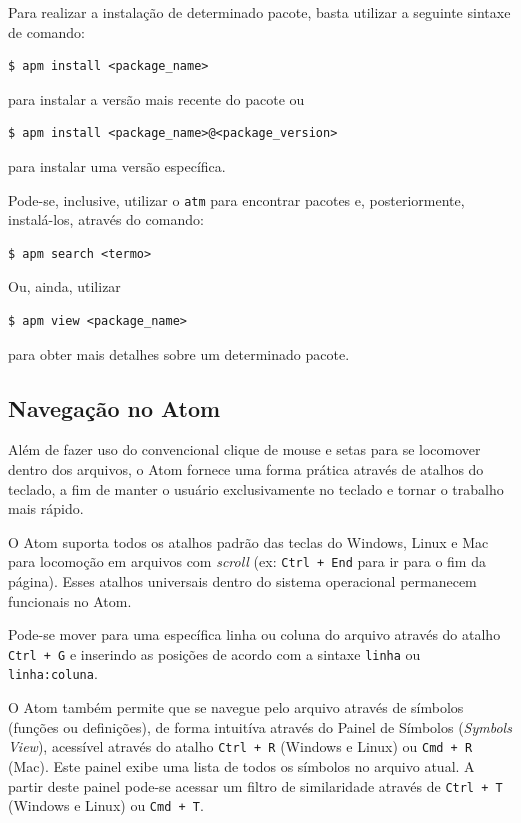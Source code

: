 	Para realizar a instalação de determinado pacote, basta utilizar a seguinte sintaxe de comando:
	\begin{Verbatim}[fontsize=\footnotesize]
$ apm install <package_name>
	\end{Verbatim}
	para instalar a versão mais recente do pacote ou
	\begin{Verbatim}[fontsize=\footnotesize]
$ apm install <package_name>@<package_version>
	\end{Verbatim}
	para instalar uma versão específica.

	Pode-se, inclusive, utilizar o \verb|atm| para encontrar pacotes e, posteriormente, instalá-los, através do comando:
	\begin{Verbatim}[fontsize=\footnotesize]
$ apm search <termo>
	\end{Verbatim}
	Ou, ainda, utilizar
	\begin{Verbatim}[fontsize=\footnotesize]
$ apm view <package_name>
	\end{Verbatim}
	para obter mais detalhes sobre um determinado pacote.

	\subsection{Navegação no Atom}
	Além de fazer uso do convencional clique de mouse e setas para se locomover dentro dos arquivos, o Atom fornece uma forma prática através de atalhos do teclado, a fim de manter o usuário exclusivamente no teclado e tornar o trabalho mais rápido.

	O Atom suporta todos os atalhos padrão das teclas do Windows, Linux e Mac para locomoção em arquivos com \textit{scroll} (ex: \verb|Ctrl + End| para ir para o fim da página). Esses atalhos universais dentro do sistema operacional permanecem funcionais no Atom.

	Pode-se mover para uma específica linha ou coluna do arquivo através do atalho \verb|Ctrl + G| e inserindo as posições de acordo com a sintaxe \verb|linha| ou \verb|linha:coluna|.

	O Atom também permite que se navegue pelo arquivo através de símbolos (funções ou definições), de forma intuitíva através do Painel de Símbolos (\textit{Symbols View}), acessível através do atalho \verb|Ctrl + R| (Windows e Linux) ou \verb|Cmd + R| (Mac). Este painel exibe uma lista de todos os símbolos no arquivo atual. A partir deste painel pode-se acessar um filtro de similaridade através de \verb|Ctrl + T| (Windows e Linux) ou \verb|Cmd + T|.

